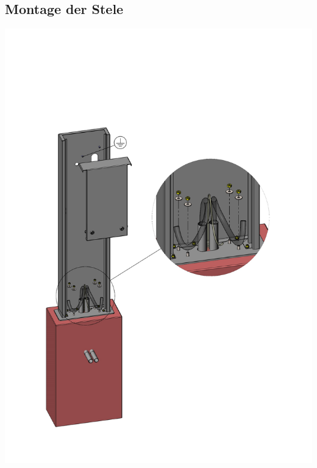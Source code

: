 \documentclass[a4paper,10pt]{article}
\begin{document}
	\subsection*{Montage der Stele}
	\label{appendix_erection}
	\begin{center}
		\includegraphics[width=0.9\linewidth]{./img/stand_erection}
	\end{center}
\end{document}

